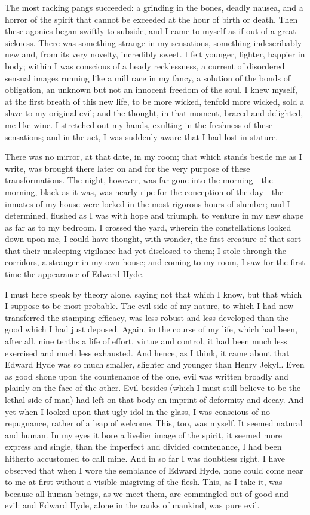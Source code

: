 \documentclass[]{novel}
\begin{document}
The most racking pangs succeeded: a grinding in the bones, deadly nausea, and a horror of the spirit that cannot be exceeded at the hour of birth or death. Then these agonies began swiftly to subside, and I came to myself as if out of a great sickness. There was something strange in my sensations, something indescribably new and, from its very novelty, incredibly sweet. I felt younger, lighter, happier in body; within I was conscious of a heady recklessness, a current of disordered sensual images running like a mill race in my fancy, a solution of the bonds of obligation, an unknown but not an innocent freedom of the soul. I knew myself, at the first breath of this new life, to be more wicked, tenfold more wicked, sold a slave to my original evil; and the thought, in that moment, braced and delighted, me like wine. I stretched out my hands, exulting in the freshness of these sensations; and in the act, I was suddenly aware that I had lost in stature.

There was no mirror, at that date, in my room; that which stands beside me as I write, was brought there later on and for the very purpose of these transformations. The night, however, was far gone into the morning—the morning, black as it was, was nearly ripe for the conception of the day—the inmates of my house were locked in the most rigorous hours of slumber; and I determined, flushed as I was with hope and triumph, to venture in my new shape as far as to my bedroom. I crossed the yard, wherein the constellations looked down upon me, I could have thought, with wonder, the first creature of that sort that their unsleeping vigilance had yet disclosed to them; I stole through the corridors, a stranger in my own house; and coming to my room, I saw for the first time the appearance of Edward Hyde.

I must here speak by theory alone, saying not that which I know, but that which I suppose to be most probable. The evil side of my nature, to which I had now transferred the stamping efficacy, was less robust and less developed than the good which I had just deposed. Again, in the course of my life, which had been, after all, nine tenths a life of effort, virtue and control, it had been much less exercised and much less exhausted. And hence, as I think, it came about that Edward Hyde was so much smaller, slighter and younger than Henry Jekyll. Even as good shone upon the countenance of the one, evil was written broadly and plainly on the face of the other. Evil besides (which I must still believe to be the lethal side of man) had left on that body an imprint of deformity and decay. And yet when I looked upon that ugly idol in the glass, I was conscious of no repugnance, rather of a leap of welcome. This, too, was myself. It seemed natural and human. In my eyes it bore a livelier image of the spirit, it seemed more express and single, than the imperfect and divided countenance, I had been hitherto accustomed to call mine. And in so far I was doubtless right. I have observed that when I wore the semblance of Edward Hyde, none could come near to me at first without a visible misgiving of the flesh. This, as I take it, was because all human beings, as we meet them, are commingled out of good and evil: and Edward Hyde, alone in the ranks of mankind, was pure evil.
\end{document}
